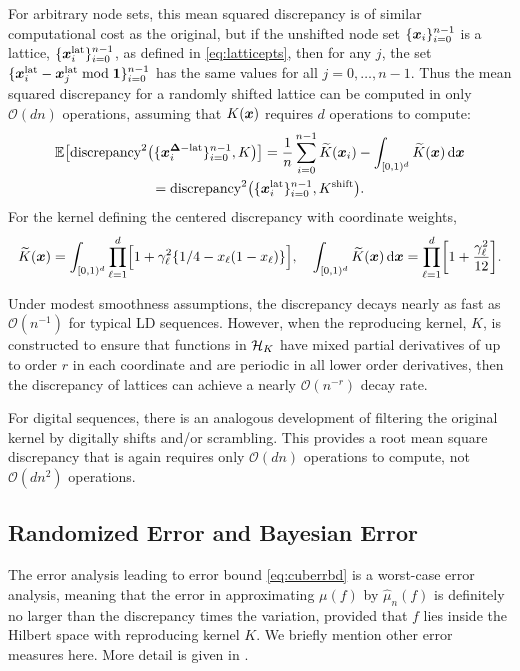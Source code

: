 \documentclass{svproc}
\begin{document}
For arbitrary node sets, this mean squared discrepancy is of similar computational cost as the original, but if the unshifted node set $\{{\boldsymbol{x}}_i\}_{i=0}^{n-1}$ is a lattice, $\{{\boldsymbol{x}}^{\text{lat}}_i\}_{i=0}^{n-1}$, as defined in \eqref{eq:latticepts}, then for any $j$, the set $\{{\boldsymbol{x}}^{\text{lat}}_i - {\boldsymbol{x}}^{\text{lat}}_j \bmod {\boldsymbol{1}} \}_{i=0}^{n-1}$ has the same values for all $j = 0, \ldots, n-1$.  Thus the mean squared discrepancy for a randomly shifted lattice can be computed in only $\mathcal{O}(dn)$ operations, assuming that $K({\boldsymbol{x}})$ requires $d$ operations to compute:
\begin{multline}
\mathbb{E}\bigl[\text{discrepancy}^2 \bigl (\{ {\boldsymbol{x}}^{{\boldsymbol{\Delta}}-\text{lat}}_{i} \}_{i=0}^{n-1}, K \bigr) \bigr] = \frac{1}{n} \sum_{i=0}^{n-1}  \widetilde{K}({\boldsymbol{x}}_i) - \int_{[0,1)^d} \widetilde{K}({\boldsymbol{x}}) \, \mathrm{d} {\boldsymbol{x}} \\
= \text{discrepancy}^2 \bigl (\{ {\boldsymbol{x}}^{\text{lat}}_{i} \}_{i=0}^{n-1}, K^{\text{shift}} \bigr).
\end{multline}
For the kernel defining the centered discrepancy with coordinate weights,
\begin{equation}
    \widetilde{K}({\boldsymbol{x}}) = \int_{[0,1)^d} \prod_{\ell = 1}^d \Bigl [ 1 + \gamma_\ell^2 \{ 1/4 - x_\ell (1-x_\ell ) \} \Bigr], \quad \int_{[0,1)^d} \widetilde{K}({\boldsymbol{x}}) \, \mathrm{d} {\boldsymbol{x}} = \prod_{\ell = 1}^d \biggl [ 1 + \frac{\gamma_\ell^2}{12} \biggr ].
\end{equation}

Under modest smoothness assumptions, the discrepancy decays nearly as fast as $\mathcal{O}(n^{-1})$ for typical LD sequences.  However, when the reproducing kernel, $K$, is constructed to ensure that functions in ${\mathcal{H}}_K$ have mixed partial derivatives of up to order $r$ in each coordinate and are periodic in all lower order derivatives, then the discrepancy of lattices can achieve a nearly $\mathcal{O}(n^{-r})$ decay rate.

For digital sequences, there is an analogous development of filtering the original kernel by digitally shifts and/or scrambling.  This provides a root mean square discrepancy that is again requires only $\mathcal{O}(dn)$ operations to compute, not $\mathcal{O}(dn^2)$ operations.

\subsection{Randomized Error and Bayesian Error} \label{sec:randBayes}
The error analysis leading to error bound \eqref{eq:cuberrbd} is a worst-case error analysis, meaning that the error in approximating $\mu(f)$ by $\hat{\mu}_n(f)$ is definitely no larger than the discrepancy times the variation, provided that $f$ lies inside the Hilbert space with reproducing kernel $K$.  We briefly mention other error measures here.  More detail is given in \cite{HicEtal17a}.
\end{document}
